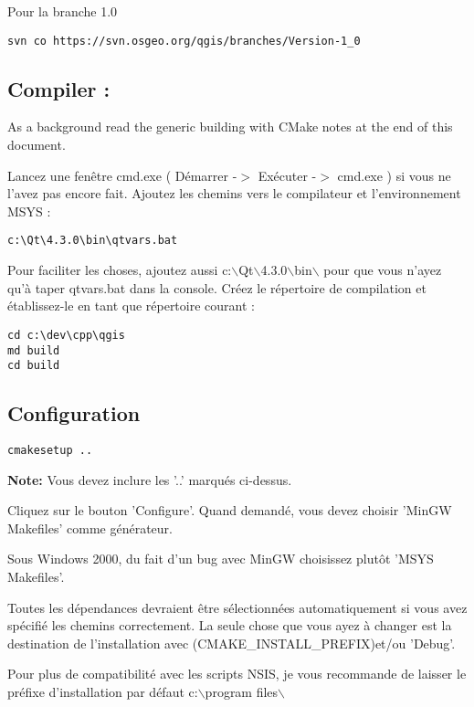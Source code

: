 Pour la branche 1.0

\begin{verbatim}
svn co https://svn.osgeo.org/qgis/branches/Version-1_0
\end{verbatim}

\subsection{Compiler :}
As a background read the generic building with CMake notes at the end of 
this document.

Lancez une fen\^etre cmd.exe ( D\'emarrer -$>$ Ex\'ecuter -$>$ cmd.exe ) si vous ne l'avez pas encore fait. Ajoutez les chemins vers le compilateur et l'environnement MSYS :

\begin{verbatim}
c:\Qt\4.3.0\bin\qtvars.bat 
\end{verbatim}

Pour faciliter les choses, ajoutez aussi c:$\backslash$Qt$\backslash$4.3.0$\backslash$bin$\backslash$ pour que vous n'ayez qu'\`a taper qtvars.bat dans la console. Cr\'eez le r\'epertoire de compilation et \'etablissez-le en tant que r\'epertoire courant :

\begin{verbatim}
cd c:\dev\cpp\qgis 
md build 
cd build 
\end{verbatim}

\subsection{Configuration}
\begin{verbatim}
cmakesetup ..  
\end{verbatim}

\textbf{Note:} Vous devez inclure les '..' marqu\'es ci-dessus.

Cliquez sur le bouton 'Configure'.  Quand demand\'e, vous devez choisir 'MinGW Makefiles' comme g\'en\'erateur.

Sous Windows 2000, du fait d'un bug avec MinGW choisissez plut\^ot 'MSYS Makefiles'.

Toutes les d\'ependances devraient \^etre s\'electionn\'ees automatiquement si vous avez sp\'ecifi\'e les chemins correctement. La seule chose que vous ayez \`a changer est la destination de l'installation avec (CMAKE\_INSTALL\_PREFIX)et/ou 'Debug'.

Pour plus de compatibilit\'e avec les scripts NSIS, je vous recommande de laisser le pr\'efixe d'installation par d\'efaut  c:$\backslash$program files$\backslash$

